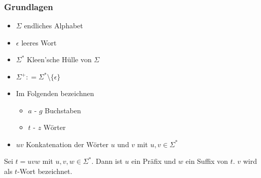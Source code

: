 \documentclass{beamer}
\newcommand{\coloneqq}{\mathrel{\mathop:}=}
\begin{document}
\begin{frame}
\frametitle{Grundlagen}
\begin{itemize}
    \item $\Sigma$ endliches Alphabet
    \item $\epsilon$ leeres Wort
    \item $\Sigma^*$ Kleen'sche Hülle von $\Sigma$
    \item $\Sigma^+ \coloneqq \Sigma^* \setminus \{\epsilon\}$
    \item Im Folgenden bezeichnen
    \begin{itemize}
        \item $a$ - $g$ Buchstaben
        \item $t$ - $z$ Wörter
    \end{itemize}
    \item $uv$ Konkatenation der Wörter $u$ und $v$ mit $u, v \in \Sigma^*$
\end{itemize}
\begin{definition}
    Sei $t = uvw$ mit $u, v, w \in \Sigma^*$. Dann ist $u$ ein Präfix und $w$ ein Suffix von $t$. $v$ wird als $t$-Wort bezeichnet.
\end{definition}
\end{frame}
\end{document}
